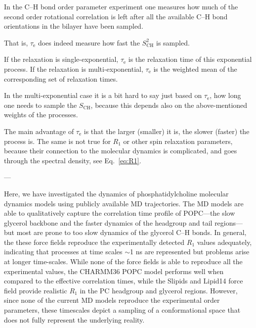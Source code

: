 \documentclass[journal=jpcbfk,manuscript=article,layout=twocolumn]{achemso}
\begin{document}
In the C--H bond order parameter experiment one measures how much of the second order rotational correlation is left after all the available C--H bond orientations in the bilayer have been sampled.

That is,  $\tau_\mathrm e$ does indeed measure how fast the $S^2_\mathrm{CH}$ is sampled.

If the relaxation is single-exponential, $\tau_\mathrm e$ is the relaxation time of this exponential process. If the relaxation is multi-exponential, $\tau_\mathrm e$ is the weighted mean of the corresponding set of relaxation times.

In the multi-exponential case it is a bit hard to say just based on $\tau_\mathrm e$, how long one needs to sample the $S_\mathrm{CH}$, because this depends also on the above-mentioned weights of the processes.

The main advantage of $\tau_\mathrm e$ is that the larger (smaller) it is, the slower (faster) the process is. The same is not true for $R_1$ or other spin relaxation parameters, because their connection to the molecular dynamics is complicated, and goes through the spectral density, see Eq.~\eqref{eq:R1}.

---



Here, we have investigated the dynamics of phosphatidylcholine molecular dynamics models using publicly available MD trajectories. The MD models are able to qualitatively capture the correlation time profile of POPC---the slow glycerol backbone and the faster dynamics of the headgroup and tail regions---but most are prone to too slow dynamics of the glycerol C--H bonds.  In general, the these force fields reproduce the experimentally detected $R_{1}$ values adequately, indicating that processes at time scales $\sim$1 ns are represented but problems arise at longer time-scales. While none of the force fields is able to reproduce all the experimental values, the CHARMM36 POPC model performs well when compared to the effective correlation times, while the Slipids and Lipid14 force field provide realistic $R_{1}$ in the PC headgroup and glycerol regions. However, since none of the current MD models reproduce the experimental order parameters, these timescales depict a sampling of a conformational space that does not fully represent the underlying reality.
\end{document}
